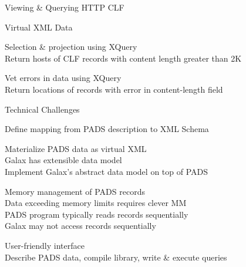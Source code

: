\documentclass[landscape]{slides}
\begin{document}
\begin{Slide}{Viewing \& Querying HTTP CLF}

  \bb Virtual XML Data
{\tiny
\begin{alltt}
\end{alltt}
}

\bb Selection \& projection using XQuery\\
\bbb Return hosts of CLF records with content length greater than 2K

{\small
\begin{alltt}
\end{alltt}}

\bb Vet errors in data using XQuery \\
\bbb Return locations of records with error in content-length field

{\small
\begin{alltt}
\end{alltt}}
\end{Slide}

\begin{Slide}{Technical Challenges}

  \bb Define mapping from PADS description to XML Schema 

  \bb Materialize PADS data as virtual XML \\
  \bbb Galax has extensible data model \\
  \bbb Implement Galax's abstract data model on top of PADS 

  \bb Memory management of PADS records \\
  \bbb Data exceeding memory limits requires clever MM\\
  \bbb PADS program typically reads records sequentially \\
  \bbb Galax may not access records sequentially 

  \bb User-friendly interface\\
  \bbb Describe PADS data, compile library, write \& execute queries

\end{Slide}
\end{document}
